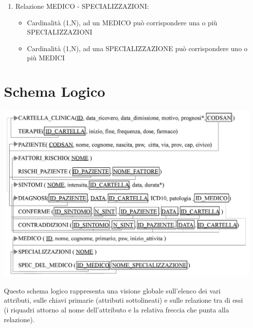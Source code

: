 \documentclass[a4paper,titlepage]{article}
\begin{document}
\begin{enumerate}
\item Relazione MEDICO - SPECIALIZZAZIONI:

\begin{itemize}[leftmargin=0.5cm, topsep=0.25cm, itemsep=0.2cm]

\item Cardinalità (1,N), ad un MEDICO può corrispondere una o più SPECIALIZZAZIONI
\item Cardinalità (1,N), ad una SPECIALIZZAZIONE può corrispondere uno o più MEDICI

\end{itemize}

\end{enumerate}

\newpage

\part{Schema Logico}
    \begin{center}

    \centering
    \includegraphics[scale=0.9]{schema_logico.jpg}

    \end{center}

Questo schema logico rappresenta una visione globale sull'elenco dei vari attributi, sulle chiavi primarie (attributi sottolineati) e sulle relazione tra di essi (i riquadri attorno al nome dell'attributo e la relativa freccia che punta alla relazione).
\newpage
\end{document}
